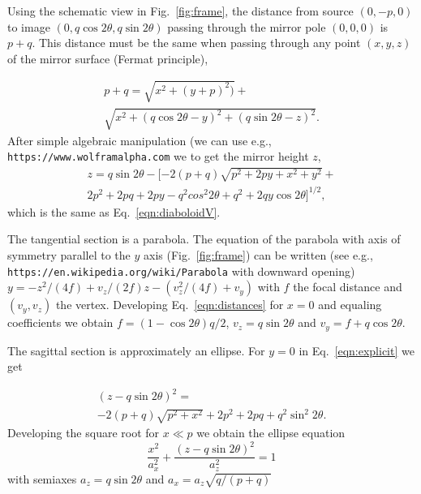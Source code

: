 \documentclass{iucr}              %
\begin{document}
Using the schematic view in Fig.~\ref{fig:frame}, the distance from source $(0,-p,0)$ to image $(0,q \cos2\theta, q \sin2\theta)$ passing through the mirror pole $(0,0,0)$ is $p+q$. This distance must be the same when passing through any point $(x,y,z)$ of the mirror surface (Fermat principle),

\begin{multline}
\label{eqn:distances}
p + q = 
\sqrt{x^2 + (y + p)^2)} + \\
\sqrt{x^2 + (q \cos2 \theta - y)^2 + (q \sin2 \theta - z)^2}.
\end{multline}
After simple algebraic manipulation (we can use e.g., {\tt https://www.wolframalpha.com} we to get the mirror height $z$,
\begin{multline}
\label{eqn:explicit}
z = q \sin2\theta - 
[-2 (p + q) \sqrt{p^2 + 2 p y + x^2 + y^2} + \\ 
2 p^2 +2  p q +  2 p y - q^2 cos^2 2 \theta +  q^2 + 2 q y \cos2\theta ]^{1/2},
\end{multline}
which is the same as Eq.~\ref{eqn:diaboloidV}. 

The tangential section is a parabola. The equation of the parabola with axis of symmetry parallel to the $y$ axis (Fig.~\ref{fig:frame}) can be written (see e.g., {\tt https://en.wikipedia.org/wiki/Parabola} with downward opening) $y = -z^2/(4 f) + v_z/(2 f) z - (v_z^2/(4 f)+ v_y)$ with $f$ the focal distance and $(v_y,v_z)$ the vertex. Developing Eq.~\ref{eqn:distances} for $x=0$ and equaling coefficients we obtain $f=(1-\cos2\theta)q/2$, $v_z=q \sin2\theta$ and $v_y=f+q\cos2\theta$.

The sagittal section is approximately an ellipse. For $y=0$ in Eq.~\ref{eqn:explicit} we get

\begin{multline}
\label{eqn:ellipse}
(z - q \sin2\theta)^2 = \\
-2 (p + q) \sqrt{p^2 + x^2}+ 
2 p^2 +2  p q + q^2 \sin^2 2 \theta.
\end{multline}
Developing the square root for $x\ll p$ we obtain the ellipse equation
\begin{equation}
\label{eqn:ellipse}
\frac{x^2}{a_x^2} + \frac{(z-q \sin2\theta)^2}{a_z^2}=1
\end{equation}
with semiaxes $a_z=q \sin2\theta$ and $a_x=a_z\sqrt{q/(p+q)}$
\end{document}
